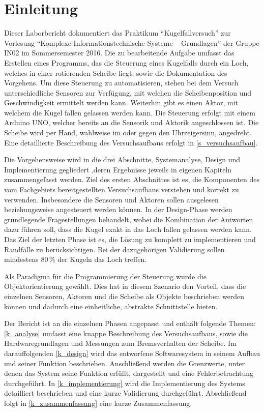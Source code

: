 \chapter{Einleitung}
Dieser Laborbericht dokumentiert das Praktikum \enquote{Kugelfallversuch} zur Vorlesung \enquote{Komplexe Informationstechnische Systeme -- Grundlagen} der Gruppe IN02 im Sommersemester 2016.
Die zu bearbeitende Aufgabe umfasst das Erstellen eines Programms, das die Steuerung eines Kugelfalls durch ein Loch, welches in einer rotierenden Scheibe liegt, sowie die Dokumentation des Vorgehens.
Um diese Steuerung zu automatisieren, stehen bei dem Versuch unterschiedliche Sensoren zur Verfügung, mit welchen die Scheibenposition und Geschwindigkeit ermittelt werden kann.
Weiterhin gibt es einen Aktor, mit welchem die Kugel fallen gelassen werden kann.
Die Steuerung erfolgt mit einem Arduino UNO, welcher bereits an die Sensorik und Aktorik angeschlossen ist.
Die Scheibe wird per Hand, wahlweise im oder gegen den Uhrzeigersinn, angedreht.
Eine detaillierte Beschreibung des Versuchsaufbaus erfolgt in \cref{s_versuchsaufbau}.

Die Vorgehensweise wird in die drei Abschnitte, Systemanalyse, Design und Implementierung gegliedert ,deren Ergebnisse jeweils in eigenen Kapiteln zusammengefasst werden.
Ziel des ersten Abschnittes ist es, die Komponenten des vom Fachgebiets bereitgestellten Versuchsaufbaus verstehen und korrekt zu verwenden.
Insbesondere die Sensoren und Aktoren sollen ausgelesen beziehungsweise angesteuert werden können.
In der Design-Phase werden grundlegende Fragestellungen behandelt, wobei die Kombination der Antworten dazu führen soll, dass die Kugel exakt in das Loch fallen gelassen werden kann.
Das Ziel der letzten Phase ist es, die Lösung zu komplett zu implementieren und Randfälle zu berücksichtigen.
Bei der dazugehörigen Validierung sollen mindestens 80\,\% der Kugeln das Loch treffen.

Als Paradigma für die Programmierung der Steuerung wurde die Objektorientierung gewählt.
Dies hat in diesem Szenario den Vorteil, dass die einzelnen Sensoren, Aktoren und die Scheibe als Objekte beschrieben werden können und dadurch eine einheitliche, abstrakte Schnittstelle bieten.

Der Bericht ist an die einzelnen Phasen angepasst und enthält folgende Themen:\\
\cref{k_analyse} umfasst eine knappe Beschreibung des Versuchsaufbaus, sowie die Hardwaregrundlagen und Messungen zum Bremsverhalten der Scheibe. 
Im darauffolgenden \cref{k_design} wird das entworfene Softwaresystem in seinem Aufbau und seiner Funktion beschrieben.
Anschließend werden die Grenzwerte, unter denen das System seine Funktion erfüllt, dargestellt und eine Fehlerbetrachtung durchgeführt.
In \cref{k_implementierung} wird die Implementierung des Systems detailliert beschrieben und eine kurze Validierung durchgeführt.
Abschließend folgt in \cref{k_zusammenfassung} eine kurze Zusammenfassung.
